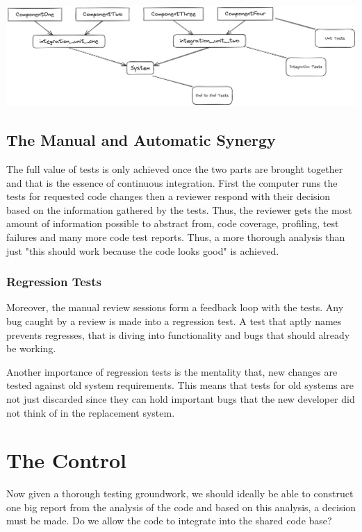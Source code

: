 \documentclass{article}
\begin{document}
\includegraphics[width=\linewidth]{ModularizedTesting(1).png}

\subsection{The Manual and Automatic Synergy}

The full value of tests is only achieved once the two parts are brought together and that is the essence of
continuous integration. First the computer runs the tests for requested code changes then a reviewer respond with their decision
based on the information gathered by the tests. Thus, the reviewer gets the most amount of information possible to abstract from, code coverage, profiling,
test failures and many more code test reports. Thus, a more thorough analysis than just "this should work because the code looks good" is achieved.
\subsubsection{Regression Tests}

Moreover, the manual review sessions form a feedback loop with the tests. Any bug caught by a review is made into a regression test.
A test that aptly names prevents regresses, that is diving into functionality and bugs that should already be working.

Another importance of regression tests is the mentality that, new changes are tested against old system requirements. This means that tests
for old systems are not just discarded since they can hold important bugs that the new developer did not think of in the replacement system.

\section{The Control}
Now given a thorough testing groundwork, we should ideally be able to construct one big report from the analysis of the code
and based on this analysis, a decision must be made. 
    Do we allow the code to integrate into the shared code base?
\end{document}
